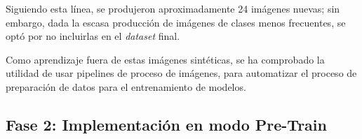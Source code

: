 \noindent
Siguiendo esta línea, 
se produjeron aproximadamente 24 imágenes nuevas; sin embargo, dada la escasa producción 
de imágenes de clases menos frecuentes, se optó por no incluirlas en el \textit{dataset} final.

\quad

\noindent
Como aprendizaje fuera de estas imágenes sintéticas, se ha comprobado la utilidad de usar pipelines de
proceso de imágenes, para automatizar el proceso de preparación de datos para el entrenamiento de modelos.


\subsection{Fase 2: Implementación en modo Pre-Train}
